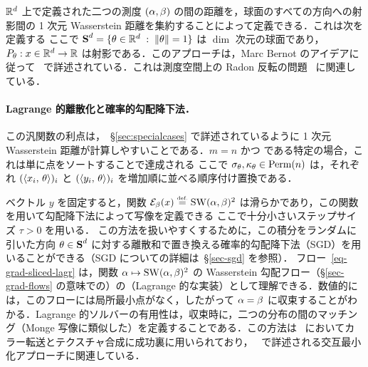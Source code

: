 $\mathbb{R}^d$ 上で定義された二つの測度 $(\alpha,\beta)$ の間の距離を，球面のすべての方向への射影間の 1 次元 Wasserstein 距離を集約することによって定義できる．これは次を定義する
ここで $\mathrm{\textbf{S}}^d = \{ \theta \in \mathbb{R}^d \;:\; \left\| \theta \right\|=1 \}$ は $\dim$ 次元の球面であり，$P_\theta : x \in \mathbb{R}^d \rightarrow \mathbb{R}$ は射影である．このアプローチは，Marc Bernot のアイデアに従って~\citep{2013-Bonneel-barycenter} で詳述されている．これは測度空間上の Radon 反転の問題~\citep{AbrahamRadon} に関連している．

\paragraph{Lagrange 的離散化と確率的勾配降下法．}

この汎関数の利点は，~\S\ref{sec:specialcases} で詳述されているように 1 次元 Wasserstein 距離が計算しやすいことである．$m=n$ かつ
である特定の場合，これは単に点をソートすることで達成される
ここで $\sigma_\theta,\kappa_\theta \in \mathrm{Perm}(n)$ は，それぞれ $(\langle x_i,\,\theta\rangle)_i$ と $(\langle y_i,\,\theta\rangle)_i$ を増加順に並べる順序付け置換である．

ベクトル $y$ を固定すると，関数 $\mathcal{E}_\beta(x) \stackrel{\mbox{\upshape\tiny def.}}{=} \operatorname{SW}(\alpha,\beta)^2$ は滑らかであり，この関数を用いて勾配降下法によって写像を定義できる
ここで十分小さいステップサイズ $\tau>0$ を用いる．
%
この方法を扱いやすくするために，この積分をランダムに引いた方向 $\theta \in \mathrm{\textbf{S}}^d$ に対する離散和で置き換える確率的勾配降下法（SGD）を用いることができる（SGD についての詳細は~\S\ref{sec-sgd} を参照）．
%
フロー~\eqref{eq-grad-sliced-lagr} は，関数 $\alpha \mapsto \operatorname{SW}(\alpha,\beta)^2$ の Wasserstein 勾配フロー（\S\ref{sec-grad-flows} の意味での）の（Lagrange 的な実装）として理解できる．数値的には，このフローには局所最小点がなく，したがって $\alpha=\beta$ に収束することがわかる．Lagrange 的ソルバーの有用性は，収束時に，二つの分布の間のマッチング（Monge 写像に類似した）を定義することである．この方法は~\citep{rabin-ssvm-11} においてカラー転送とテクスチャ合成に成功裏に用いられており，~\citep{pitie2007automated} で詳述される交互最小化アプローチに関連している．

